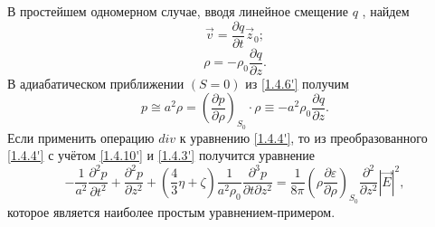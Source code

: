 \documentclass[a4paper]{article}
\begin{document}
В простейшем одномерном случае, вводя линейное смещение $q$ , найдем
\begin{equation}
	\vec{v}=\frac{\partial q}{\partial t}\vec{z}_{0};\tag{8'}\label{1.4.8'}
\end{equation}
\begin{equation}
	\rho=-\rho_{0}\frac{\partial q}{\partial z}.
	\tag{9'}\label{1.4.9'}
\end{equation}
В адиабатическом приближении $(S=0)$ из \eqref{1.4.6'} получим 
\begin{equation}
	p\cong a^{2}\rho=\left(\frac{\partial p}{\partial \rho}\right)_{S_{0}}\cdot\rho\equiv-a^{2}\rho_{0}\frac{\partial q}{\partial z}.
	\label{1.4.10'}\tag{10'}
\end{equation}
Если применить операцию $div$  к уравнению \eqref{1.4.4'}, то из преобразованного \eqref{1.4.4'} с учётом \eqref{1.4.10'} и \eqref{1.4.3'} получится уравнение   
\begin{equation}
	-\frac{1}{a^{2}}\frac{\partial^{2}p}{\partial t^{2}}+\frac{\partial^{2}p}{\partial z^{2}}+\left(\frac{4}{3}\eta+\zeta\right)\frac{1}{a^{2}\rho_{0}}\frac{\partial^{3}p}{\partial t\partial z^{2}}=\frac{1}{8\pi}\left(\rho\frac{\partial\varepsilon}{\partial\rho}\right)_{S_{0}}\frac{\partial^{2}}{\partial z^{2}}\left|\vec{E}\right|^{2},
	\tag{11'}
	\label{1.4.11'}
\end{equation}
которое является наиболее простым уравнением-примером. 
\end{document}
